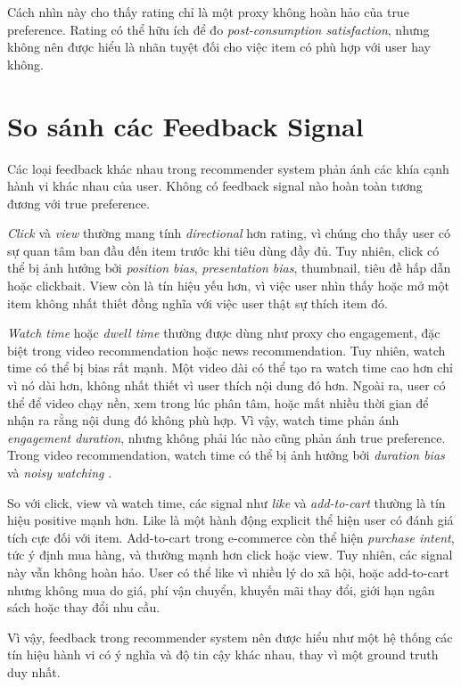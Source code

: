 \documentclass[12pt,a4paper]{article}
\begin{document}
Cách nhìn này cho thấy rating chỉ là một proxy không hoàn hảo của true preference. 
Rating có thể hữu ích để đo \textit{post-consumption satisfaction}, nhưng không nên được hiểu là nhãn tuyệt đối cho việc item có phù hợp với user hay không.

\section{So sánh các Feedback Signal}

Các loại feedback khác nhau trong recommender system phản ánh các khía cạnh hành vi khác nhau của user. 
Không có feedback signal nào hoàn toàn tương đương với true preference.

\textit{Click} và \textit{view} thường mang tính \textit{directional} hơn rating, vì chúng cho thấy user có sự quan tâm ban đầu đến item trước khi tiêu dùng đầy đủ. 
Tuy nhiên, click có thể bị ảnh hưởng bởi \textit{position bias}, \textit{presentation bias}, thumbnail, tiêu đề hấp dẫn hoặc clickbait. 
View còn là tín hiệu yếu hơn, vì việc user nhìn thấy hoặc mở một item không nhất thiết đồng nghĩa với việc user thật sự thích item đó.

\textit{Watch time} hoặc \textit{dwell time} thường được dùng như proxy cho engagement, đặc biệt trong video recommendation hoặc news recommendation. 
Tuy nhiên, watch time có thể bị bias rất mạnh. 
Một video dài có thể tạo ra watch time cao hơn chỉ vì nó dài hơn, không nhất thiết vì user thích nội dung đó hơn. 
Ngoài ra, user có thể để video chạy nền, xem trong lúc phân tâm, hoặc mất nhiều thời gian để nhận ra rằng nội dung đó không phù hợp. 
Vì vậy, watch time phản ánh \textit{engagement duration}, nhưng không phải lúc nào cũng phản ánh true preference. 
Trong video recommendation, watch time có thể bị ảnh hưởng bởi \textit{duration bias} và \textit{noisy watching} \cite{zhao2023watchtime}.

So với click, view và watch time, các signal như \textit{like} và \textit{add-to-cart} thường là tín hiệu positive mạnh hơn. 
Like là một hành động explicit thể hiện user có đánh giá tích cực đối với item. 
Add-to-cart trong e-commerce còn thể hiện \textit{purchase intent}, tức ý định mua hàng, và thường mạnh hơn click hoặc view. 
Tuy nhiên, các signal này vẫn không hoàn hảo. 
User có thể like vì nhiều lý do xã hội, hoặc add-to-cart nhưng không mua do giá, phí vận chuyển, khuyến mãi thay đổi, giới hạn ngân sách hoặc thay đổi nhu cầu.

Vì vậy, feedback trong recommender system nên được hiểu như một hệ thống các tín hiệu hành vi có ý nghĩa và độ tin cậy khác nhau, thay vì một ground truth duy nhất.
\end{document}
